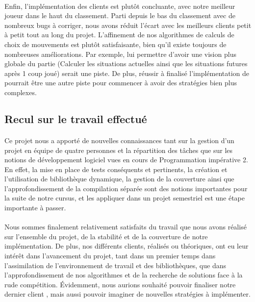 \documentclass[a4paper]{article}
\begin{document}
\paragraph{}
Enfin, l'implémentation des clients est plutôt concluante, avec notre meilleur joueur  dans le haut du classement. Parti depuis le bas du classement avec de nombreux bugs à corriger, nous avons réduit l'écart avec les meilleurs clients petit à petit tout au long du projet. L'affinement de nos algorithmes de calculs de choix de mouvements est plutôt satisfaisante, bien qu'il existe toujours de nombreuses améliorations. Par exemple, lui permettre d'avoir une vision plus globale du partie (Calculer les situations actuelles ainsi que les situations futures après 1 coup joué) serait une piste.  De plus, réussir à finalisé l'implémentation de  pourrait être une autre piste pour commencer à avoir des stratégies bien plus complexes.

\subsection{Recul sur le travail effectué}
\paragraph{}
Ce projet nous a apporté de nouvelles connaissances tant sur la gestion d'un projet en équipe de quatre personnes et la répartition des tâches que sur les notions de développement logiciel vues en cours de Programmation impérative 2. En effet, la mise en place de tests conséquents et pertinents, la création et l'utilisation de bibliothèque dynamique, la gestion de la couverture ainsi que l'approfondissement de la compilation séparée sont des notions importantes pour la suite de notre cursus, et les appliquer dans un projet semestriel est une étape importante à passer.

\paragraph{}
Nous sommes finalement relativement satisfaits du travail que nous avons réalisé sur l'ensemble du projet, de la stabilité et de la couverture de notre implémentation. De plus, nos différents clients, réalisés ou théoriques, ont eu leur intérêt dans l'avancement du projet, tant dans un premier temps dans l'assimilation de l'environnement de travail et des bibliothèques, que dans l'approfondissement de nos algorithmes et de la recherche de solutions face à la rude compétition. Évidemment, nous aurions souhaité pouvoir finaliser notre dernier client , mais aussi pouvoir imaginer de nouvelles stratégies à implémenter.

\clearpage


\end{document}
